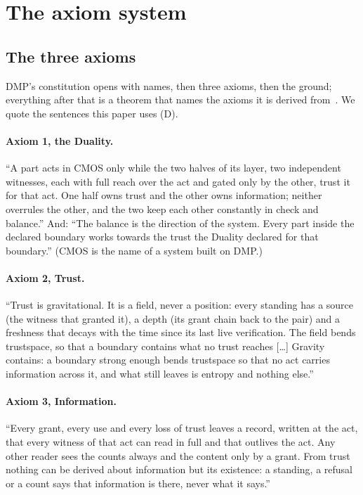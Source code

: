 \documentclass[11pt,a4paper]{article}
\theoremstyle{definition}
\newcommand{\tagD}{\textsf{(D)}}
\begin{document}
\section{The axiom system}\label{sec:axioms}

\subsection{The three axioms}

DMP's constitution opens with names, then three axioms, then the ground; everything after that is a theorem that names the axioms it is
derived from~\cite{dmp}. We quote the sentences this paper uses \tagD.

\paragraph{Axiom 1, the Duality.} ``A part acts in CMOS only while the two halves of its layer, two independent witnesses, each with full
reach over the act and gated only by the other, trust it for that act. One half owns trust and the other owns information; neither
overrules the other, and the two keep each other constantly in check and balance.'' And: ``The balance is the direction of the system.
Every part inside the declared boundary works towards the trust the Duality declared for that boundary.'' (CMOS is the name of a system
built on DMP.)

\paragraph{Axiom 2, Trust.} ``Trust is gravitational. It is a field, never a position: every standing has a source (the witness that
granted it), a depth (its grant chain back to the pair) and a freshness that decays with the time since its last live verification. The
field bends trustspace, so that a boundary contains what no trust reaches [\dots] Gravity contains: a boundary strong enough bends
trustspace so that no act carries information across it, and what still leaves is entropy and nothing else.''

\paragraph{Axiom 3, Information.} ``Every grant, every use and every loss of trust leaves a record, written at the act, that every witness
of that act can read in full and that outlives the act. Any other reader sees the counts always and the content only by a grant. From
trust nothing can be derived about information but its existence: a standing, a refusal or a count says that information is there, never
what it says.''
\end{document}
